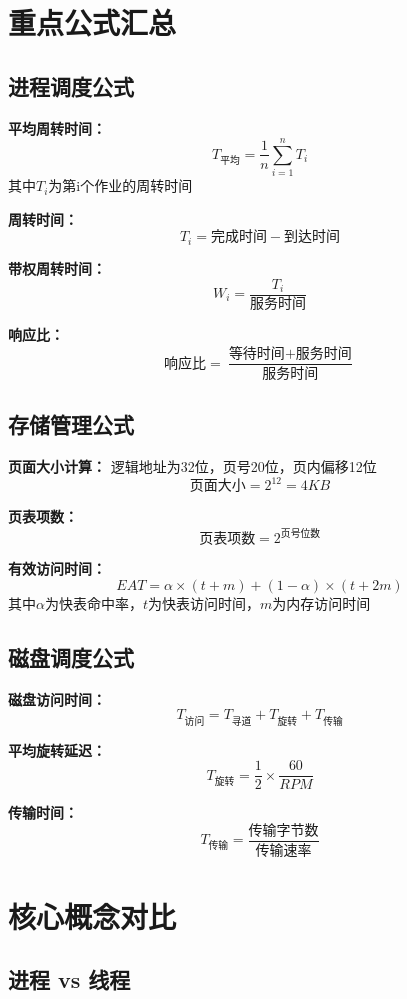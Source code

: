 \documentclass[lang=cn,newtx,10pt,scheme=chinese]{../../elegantbook}
\begin{document}
\chapter{重点公式汇总}

\section{进程调度公式}

\textbf{平均周转时间：}
$$T_{平均} = \frac{1}{n}\sum_{i=1}^{n}T_i$$
其中$T_i$为第i个作业的周转时间

\textbf{周转时间：}
$$T_i = \text{完成时间} - \text{到达时间}$$

\textbf{带权周转时间：}
$$W_i = \frac{T_i}{\text{服务时间}}$$

\textbf{响应比：}
$$\text{响应比} = \frac{\text{等待时间} + \text{服务时间}}{\text{服务时间}}$$

\section{存储管理公式}

\textbf{页面大小计算：}
逻辑地址为32位，页号20位，页内偏移12位
$$\text{页面大小} = 2^{12} = 4KB$$

\textbf{页表项数：}
$$\text{页表项数} = 2^{\text{页号位数}}$$

\textbf{有效访问时间：}
$$EAT = \alpha \times (t + m) + (1-\alpha) \times (t + 2m)$$
其中$\alpha$为快表命中率，$t$为快表访问时间，$m$为内存访问时间

\section{磁盘调度公式}

\textbf{磁盘访问时间：}
$$T_{\text{访问}} = T_{\text{寻道}} + T_{\text{旋转}} + T_{\text{传输}}$$

\textbf{平均旋转延迟：}
$$T_{\text{旋转}} = \frac{1}{2} \times \frac{60}{RPM}$$

\textbf{传输时间：}
$$T_{\text{传输}} = \frac{\text{传输字节数}}{\text{传输速率}}$$

\chapter{核心概念对比}

\section{进程 vs 线程}
\end{document}
